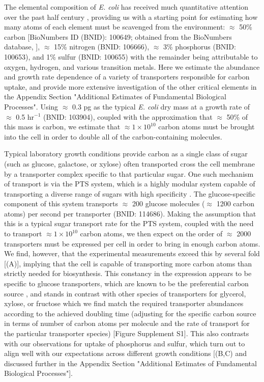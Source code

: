 The elemental composition of \textit{E. coli} has received much quantitative
attention over the past half century \citep{neidhardt1991, taymaz-nikerel2010,
heldal1985, bauer1976}, providing us with a starting point for estimating how
many atoms of each element must be scavenged from the environment: $\approx$
50\% carbon [BioNumbers ID (BNID): 100649; obtained from the BioNumbers database,
\cite{milo2010}], $\approx$ 15\% nitrogen (BNID: 106666), $\approx$ 3\% phosphorus
(BNID: 100653), and 1\% sulfur (BNID: 100655) with the remainder being
attributable to oxygen, hydrogen, and various transition metals.  Here we
estimate the abundance and growth rate dependence of a variety of transporters
responsible for carbon uptake, and provide more extensive investigation of the
other critical elements in the Appendix
Section "Additional Estimates of Fundamental Biological Processes". Using
$\approx$ 0.3 pg as the typical \textit{E. coli} dry mass at a growth rate of
$\approx$ 0.5 hr$^{-1}$ (BNID: 103904), coupled with the approximation that
$\approx$ 50\% of this mass is carbon, we estimate that $\approx 1\times
10^{10}$ carbon atoms must be brought into the cell in order to double all of
the carbon-containing molecules.

Typical laboratory growth conditions provide carbon as a single class of sugar
(such as glucose, galactose, or xylose) often transported cross the cell
membrane by a transporter complex specific to that particular sugar. One such
mechanism of transport is via the PTS system, which is a highly modular system
capable of transporting a diverse range of sugars with high specificity
\citep{escalante2012}. The glucose-specific component of this system transports
$\approx$ 200 glucose molecules ($\approx$ 1200 carbon atoms) per second per
transporter (BNID: 114686). Making the assumption that this is a typical sugar
transport rate for the PTS system, coupled with the need to transport $\approx 1
\times 10^{10}$ carbon atoms, we then expect on the order of $\approx$ 2000
transporters must be expressed per cell in order to bring in enough carbon atoms.
We find, however, that the experimental
measurements exceed this by several fold [(A)],
implying that the cell is capable of transporting more carbon atoms than
strictly needed for biosynthesis. This constancy in the expression appears to be
specific to glucose transporters, which are known to be the
preferential carbon source \citep{monod1947, liu2005a, aidelberg2014}, and
stands in contrast with other species of transporters for glycerol, xylose, or
fructose which we find match the required transporter abundances according to
the achieved doubling time (adjusting for the specific carbon source in terms of
number of carbon atoms per molecule and the rate of transport for the particular
transporter species) [Figure Supplement S1]. This also contrasts with our observations for
uptake of phosphorus and sulfur, which turn out to align well with our
expectations across different growth conditions
[(B,C) and discussed further in the Appendix
Section "Additional Estimates of Fundamental Biological Processes"].


